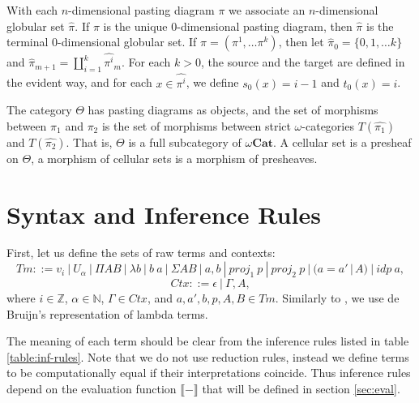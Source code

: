 \documentclass{amsart}
\theoremstyle{definition}
\theoremstyle{remark}
\newcommand{\cat}[1]{\mathbf{#1}}
\newcommand{\nats}{\mathbb{N}}
\newcommand{\Z}{\mathbb{Z}}
\newcommand{\ocat}{\omega \cat{Cat}}
\numberwithin{table}{section}
\begin{document}
With each $n$-dimensional pasting diagram $\pi$ we associate an $n$-dimensional globular set $\widehat{\pi}$.
If $\pi$ is the unique $0$-dimensional pasting diagram, then $\widehat{\pi}$ is the terminal $0$-dimensional globular set.
If $\pi = (\pi^1, \ldots \pi^k)$, then let $\widehat{\pi}_0 = \{0, 1, \ldots k\}$
and $\widehat{\pi}_{m+1} = \coprod \limits_{i = 1}^k \widehat{\pi^i}_m$.
For each $k > 0$, the source and the target are defined in the evident way,
and for each $x \in \widehat{\pi^i}$, we define $s_0(x) = i - 1$ and $t_0(x) = i$.

\begin{defn}
The category $\Theta$ has pasting diagrams as objects, and the set of morphisms between $\pi_1$ and $\pi_2$
is the set of morphisms between strict $\omega$-categories $T(\widehat{\pi_1})$ and $T(\widehat{\pi_2})$.
That is, $\Theta$ is a full subcategory of $\ocat$.
A cellular set is a presheaf on $\Theta$, a morphism of cellular sets is a morphism of presheaves.
\end{defn}

\section{Syntax and Inference Rules}

First, let us define the sets of raw terms and contexts:
\[ Tm ::= v_i\ |\ U_\alpha\ |\ \Pi A B\ |\ \lambda b\ |\ b\ a\ |\ \Sigma A B\ |\ a , b\ |\ proj_1\ p\ |\ proj_2\ p\ |\ (a = a'\,|\,A)\ |\ idp\ a, \]
\[ Ctx ::= \epsilon\ |\ \Gamma, A, \]
where $i \in \Z$, $\alpha \in \nats$, $\Gamma \in Ctx$, and $a, a', b, p, A, B \in Tm$.
Similarly to \cite{norm}, we use de Bruijn's representation of lambda terms.

The meaning of each term should be clear from the inference rules listed in table \ref{table:inf-rules}.
Note that we do not use reduction rules, instead we define terms to be computationally equal if their interpretations coincide.
Thus inference rules depend on the evaluation function $\llbracket - \rrbracket$ that will be defined in section \ref{sec:eval}.

\centerAlignProof
\end{document}
